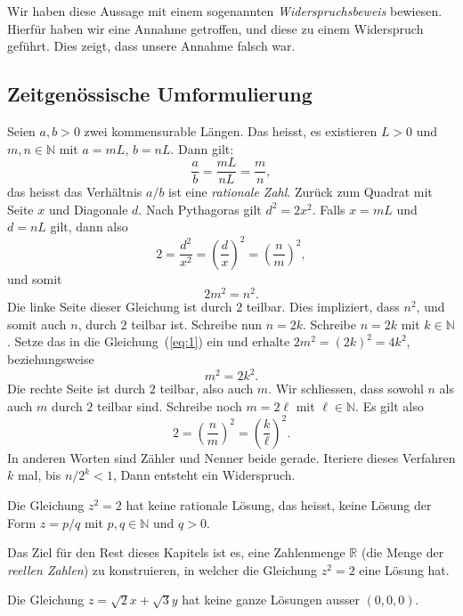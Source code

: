 \documentclass[../main.tex]{subfiles}
\begin{document}
Wir haben diese Aussage mit einem sogenannten \emph{Widerspruchsbeweis} bewiesen.
Hierfür haben wir eine Annahme getroffen, und diese zu einem Widerspruch geführt.
Dies zeigt, dass unsere Annahme falsch war.

\subsection*{Zeitgenössische Umformulierung}
Seien $a,b > 0$ zwei kommensurable Längen. Das heisst, es existieren $L > 0$
und $m,n \in \mathbb N$ mit $a = mL$, $b= nL$. Dann gilt:
\[\frac{a}{b} = \frac{mL}{nL} = \frac{m}{n},\]
das heisst das Verhältnis $a/b$ ist eine \emph{rationale Zahl}.
Zurück zum Quadrat mit Seite $x$ und Diagonale $d$. Nach Pythagoras
gilt $d^{2} = 2x^{2}$. Falls $x=mL$ und $d=nL$ gilt,
dann also
\[2 = \frac{d^{2}}{x^{2}} = {\left( \frac{d}{x}\right)}^{2} = {\left(\frac{n}{m}\right)}^{2},\]
und somit
\begin{equation}
  \label{eq:1}
2m^{2} = n^{2}.
\end{equation}
Die linke Seite dieser Gleichung ist durch $2$ teilbar. Dies impliziert, dass $n^{2}$, und
somit auch $n$, durch $2$ teilbar ist. Schreibe nun $n = 2k$. Schreibe $n = 2k$ mit
$k \in \mathbb N$. Setze das in die Gleichung~(\ref{eq:1}) ein und erhalte
$2m^{2} = {(2k)}^{2} = 4k^{2}$,
beziehungsweise
\[m^{2} = 2k^{2}.\]
Die rechte Seite ist durch $2$ teilbar, also auch $m$.
Wir schliessen, dass sowohl $n$ als auch $m$ durch $2$ teilbar sind.
Schreibe noch $m = 2\ell$ mit $\ell \in \mathbb N$. Es gilt also
\[ 2 = {\left(\frac{n}{m}\right)}^{2}
  = {\left(\frac{k}{\ell}\right)}^{2}.\]
In anderen Worten sind Zähler und Nenner beide gerade.
Iteriere dieses Verfahren $k$ mal, bis $n/2^{k} < 1$, Dann entsteht ein Widerspruch.

\begin{corollary}
  Die Gleichung $z^{2} = 2$ hat keine rationale Lösung, das heisst,
  keine Lösung der Form $z = p/q$ mit $p, q \in \mathbb N$ und $q > 0$.
\end{corollary}

Das Ziel für den Rest dieses Kapitels ist es, eine Zahlenmenge $\mathbb R$ (die Menge
der \emph{reellen Zahlen}) zu konstruieren, in welcher die Gleichung
$z^{2} = 2$ eine Lösung hat.

\begin{exercise}
  Die Gleichung $z = \sqrt 2 x + \sqrt 3 y$ hat keine ganze Lösungen ausser $(0,0,0)$.
\end{exercise}
\end{document}
